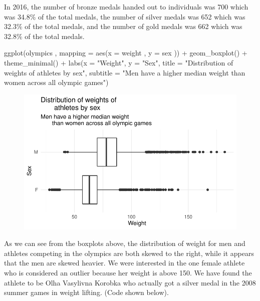 \documentclass[
  letterpaper,
  DIV=11,
  numbers=noendperiod]{scrartcl}
\newenvironment{Shaded}{\begin{snugshade}}{\end{snugshade}}
\newcommand{\AttributeTok}[1]{\textcolor[rgb]{0.40,0.45,0.13}{#1}}
\newcommand{\FunctionTok}[1]{\textcolor[rgb]{0.28,0.35,0.67}{#1}}
\newcommand{\NormalTok}[1]{\textcolor[rgb]{0.00,0.23,0.31}{#1}}
\newcommand{\SpecialCharTok}[1]{\textcolor[rgb]{0.37,0.37,0.37}{#1}}
\newcommand{\StringTok}[1]{\textcolor[rgb]{0.13,0.47,0.30}{#1}}
\begin{document}
In 2016, the number of bronze medals handed out to individuals was 700
which was 34.8\% of the total medals, the number of silver medals was
652 which was 32.3\% of the total medals, and the number of gold medals
was 662 which was 32.8\% of the total medals.

\begin{Shaded}
\begin{Highlighting}[]
\FunctionTok{ggplot}\NormalTok{(olympics , }\AttributeTok{mapping =} \FunctionTok{aes}\NormalTok{(}\AttributeTok{x =}\NormalTok{ weight , }\AttributeTok{y =}\NormalTok{ sex )) }\SpecialCharTok{+} 
  \FunctionTok{geom\_boxplot}\NormalTok{() }\SpecialCharTok{+} 
  \FunctionTok{theme\_minimal}\NormalTok{() }\SpecialCharTok{+} 
  \FunctionTok{labs}\NormalTok{(}\AttributeTok{x =} \StringTok{"Weight"}\NormalTok{, }\AttributeTok{y =} \StringTok{"Sex"}\NormalTok{, }\AttributeTok{title =} \StringTok{"Distribution of weights of }
\StringTok{       athletes by sex"}\NormalTok{, }\AttributeTok{subtitle =} \StringTok{"Men have a higher median weight }
\StringTok{       than women across all olympic games"}\NormalTok{)}
\end{Highlighting}
\end{Shaded}

\begin{figure}[H]

{\centering \includegraphics{project_files/figure-pdf/unnamed-chunk-6-1.pdf}

}

\end{figure}

As we can see from the boxplots above, the distribution of weight for
men and \women athletes competing in the olympics are both skewed to the
right, while it appears that the men are skewed heavier. We were
interested in the one female athlete who is considered an outlier
because her weight is above 150. We have found the athlete to be Olha
Vasylivna Korobka who actually got a silver medal in the 2008 summer
games in weight lifting. (Code shown below).
\end{document}
